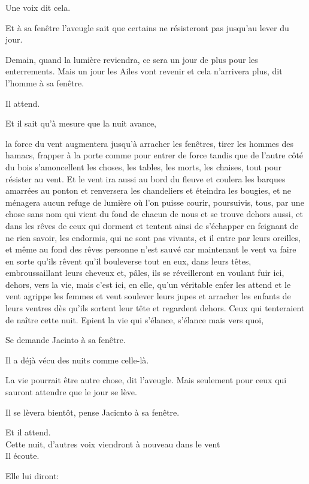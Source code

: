 Une voix dit cela.

Et à sa fenêtre l'aveugle sait que certains ne résisteront pas jusqu'au
lever du jour.

Demain, quand la lumière reviendra, ce sera un jour de plus pour les
enterrements. Mais un jour les Ailes vont revenir et cela n'arrivera
plus, dit l'homme à sa fenêtre.

Il attend.

Et il sait qu'à mesure que la nuit avance,

la force du vent augmentera jusqu'à arracher les fenêtres, tirer les
hommes des hamacs, frapper à la porte comme pour entrer de force tandis
que de l'autre côté du bois s'amoncellent les choses, les tables, les
morts, les chaises, tout pour résister au vent. Et le vent ira aussi au
bord du fleuve et coulera les barques amarrées au ponton et renversera
les chandeliers et éteindra les bougies, et ne ménagera aucun refuge de
lumière où l'on puisse courir, poursuivis, tous, par une chose sans nom
qui vient du fond de chacun de nous et se trouve dehors aussi, et dans
les rêves de ceux qui dorment et tentent ainsi de s'échapper en feignant
de ne rien savoir, les endormis, qui ne sont pas vivants, et il entre
par leurs oreilles, et même au fond des rêves personne n'est sauvé car
maintenant le vent va faire en sorte qu'ils rêvent qu'il bouleverse tout
en eux, dans leurs têtes, embroussaillant leurs cheveux et, pâles, ils
se réveilleront en voulant fuir ici, dehors, vers la vie, mais c'est
ici, en elle, qu'un véritable enfer les attend et le vent agrippe les
femmes et veut soulever leurs jupes et arracher les enfants de leurs
ventres dès qu'ils sortent leur tête et regardent dehors. Ceux qui
tenteraient de naître cette nuit. Epient la vie qui s'élance, s'élance
mais vers quoi,

Se demande Jacinto à sa fenêtre.

Il a déjà vécu des nuits comme celle-là.

La vie pourrait être autre chose, dit l'aveugle. Mais seulement pour
ceux qui sauront attendre que le jour se lève.

Il se lèvera bientôt, pense Jacicnto à sa fenêtre.

Et il attend.\\

Cette nuit, d'autres voix viendront à nouveau dans le vent\\

Il écoute.

Elle lui diront:

